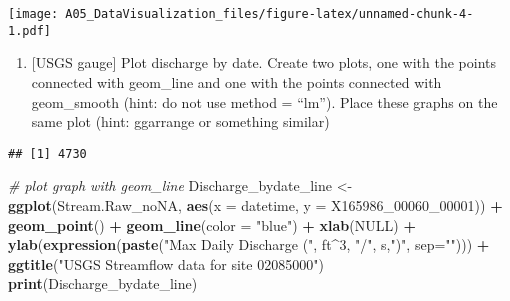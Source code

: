\documentclass[]{article}
\newenvironment{Shaded}{\begin{snugshade}}{\end{snugshade}}
\newcommand{\KeywordTok}[1]{\textcolor[rgb]{0.13,0.29,0.53}{\textbf{#1}}}
\newcommand{\DataTypeTok}[1]{\textcolor[rgb]{0.13,0.29,0.53}{#1}}
\newcommand{\DecValTok}[1]{\textcolor[rgb]{0.00,0.00,0.81}{#1}}
\newcommand{\StringTok}[1]{\textcolor[rgb]{0.31,0.60,0.02}{#1}}
\newcommand{\CommentTok}[1]{\textcolor[rgb]{0.56,0.35,0.01}{\textit{#1}}}
\newcommand{\OtherTok}[1]{\textcolor[rgb]{0.56,0.35,0.01}{#1}}
\newcommand{\OperatorTok}[1]{\textcolor[rgb]{0.81,0.36,0.00}{\textbf{#1}}}
\newcommand{\NormalTok}[1]{#1}
\providecommand{\tightlist}{%
  \setlength{\itemsep}{0pt}\setlength{\parskip}{0pt}}
\begin{document}
\texttt{[image: A05\_DataVisualization\_files/figure-latex/unnamed-chunk-4-1.pdf]}

\begin{enumerate}
\def\labelenumi{\arabic{enumi}.}
\setcounter{enumi}{5}
\tightlist
\item
  {[}USGS gauge{]} Plot discharge by date. Create two plots, one with
  the points connected with geom\_line and one with the points connected
  with geom\_smooth (hint: do not use method = ``lm''). Place these
  graphs on the same plot (hint: ggarrange or something similar)
\end{enumerate}

\begin{Shaded}
\end{Shaded}

\begin{verbatim}
## [1] 4730
\end{verbatim}

\begin{Shaded}
\begin{Highlighting}[]
\CommentTok{# plot graph with geom_line}
\NormalTok{Discharge_bydate_line <-}\StringTok{ }\KeywordTok{ggplot}\NormalTok{(Stream.Raw_noNA, }\KeywordTok{aes}\NormalTok{(}\DataTypeTok{x =}\NormalTok{ datetime, }\DataTypeTok{y =}\NormalTok{ X165986_00060_}\DecValTok{00001}\NormalTok{)) }\OperatorTok{+}
\StringTok{  }\KeywordTok{geom_point}\NormalTok{() }\OperatorTok{+}
\StringTok{  }\KeywordTok{geom_line}\NormalTok{(}\DataTypeTok{color =} \StringTok{"blue"}\NormalTok{) }\OperatorTok{+}
\StringTok{  }\KeywordTok{xlab}\NormalTok{(}\OtherTok{NULL}\NormalTok{) }\OperatorTok{+}
\StringTok{  }\KeywordTok{ylab}\NormalTok{(}\KeywordTok{expression}\NormalTok{(}\KeywordTok{paste}\NormalTok{(}\StringTok{"Max Daily Discharge ("}\NormalTok{, ft}\OperatorTok{^}\DecValTok{3}\NormalTok{, }\StringTok{"/"}\NormalTok{, s,}\StringTok{")"}\NormalTok{, }\DataTypeTok{sep=}\StringTok{""}\NormalTok{))) }\OperatorTok{+}
\StringTok{  }\KeywordTok{ggtitle}\NormalTok{(}\StringTok{"USGS Streamflow data for site 02085000"}\NormalTok{)}
\KeywordTok{print}\NormalTok{(Discharge_bydate_line)}
\end{Highlighting}
\end{Shaded}
\end{document}
